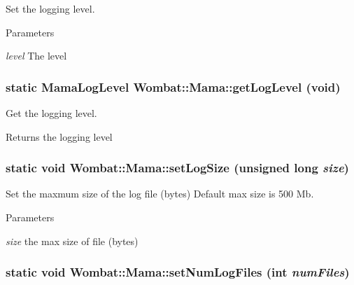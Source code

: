 Set the logging level. 
\begin{DoxyParams}{Parameters}
\item[{\em level}]The level \end{DoxyParams}
\hypertarget{classWombat_1_1Mama_a735937f0a46d4e5685b24369a0675c11}{
\subsubsection[{getLogLevel}]{\setlength{\rightskip}{0pt plus 5cm}static MamaLogLevel Wombat::Mama::getLogLevel (void)}}
\label{classWombat_1_1Mama_a735937f0a46d4e5685b24369a0675c11}


Get the logging level. \begin{DoxyReturn}{Returns}
the logging level 
\end{DoxyReturn}
\hypertarget{classWombat_1_1Mama_abaa6a46829a05b403494a9ae51829fda}{
\subsubsection[{setLogSize}]{\setlength{\rightskip}{0pt plus 5cm}static void Wombat::Mama::setLogSize (unsigned long {\em size})}}
\label{classWombat_1_1Mama_abaa6a46829a05b403494a9ae51829fda}


Set the maxmum size of the log file (bytes) Default max size is 500 Mb. 
\begin{DoxyParams}{Parameters}
\item[{\em size}]the max size of file (bytes) \end{DoxyParams}
\hypertarget{classWombat_1_1Mama_a9455d10311f3c50fa3542309c72d8b42}{
\subsubsection[{setNumLogFiles}]{\setlength{\rightskip}{0pt plus 5cm}static void Wombat::Mama::setNumLogFiles (int {\em numFiles})}}
\label{classWombat_1_1Mama_a9455d10311f3c50fa3542309c72d8b42}


